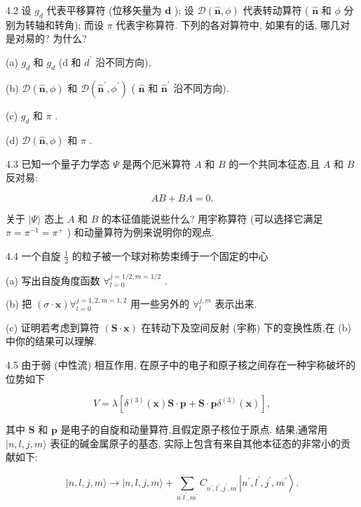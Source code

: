 4.2 设 ${g}_{d}$ 代表平移算符 (位移矢量为 $\mathbf{d}$ ); 设 $\mathcal{D}\left( {\widehat{\mathbf{n}},\phi }\right)$ 代表转动算符 ( $\widehat{\mathbf{n}}$ 和 $\phi$ 分别为转轴和转角); 而设 $\pi$ 代表宇称算符. 下列的各对算符中, 如果有的话, 哪几对是对易的? 为什么?

(a) ${g}_{d}$ 和 ${g}_{d}$ (d 和 ${d}^{\prime }$ 沿不同方向),

(b) $\mathcal{D}\left( {\widehat{\mathbf{n}},\phi }\right)$ 和 $\mathcal{D}\left( {{\widehat{\mathbf{n}}}^{\prime },{\phi }^{\prime }}\right)$ ( $\widehat{\mathbf{n}}$ 和 ${\widehat{\mathbf{n}}}^{\prime }$ 沿不同方向).

(c) ${g}_{d}$ 和 $\pi$ .

(d) $\mathcal{D}\left( {\widehat{\mathbf{n}},\phi }\right)$ 和 $\pi$ .

4.3 已知一个量子力学态 $\Psi$ 是两个厄米算符 $A$ 和 $B$ 的一个共同本征态,且 $A$ 和 $B$ 反对易:

$$
{AB} + {BA} = 0.
$$

关于 $|\Psi \rangle$ 态上 $A$ 和 $B$ 的本征值能说些什么? 用宇称算符 (可以选择它满足 $\pi = {\pi }^{-1} = {\pi }^{ + }$ ) 和动量算符为例来说明你的观点.

4.4 一个自旋 $\frac{1}{2}$ 的粒子被一个球对称势束缚于一个固定的中心

(a) 写出自旋角度函数 ${\forall }_{l = 0}^{j = 1/2, m = 1/2}$ .

(b) 把 $\left( {\sigma \cdot \mathbf{x}}\right) {\forall }_{l = 0}^{j = 1,2, m = 1,2}$ 用一些另外的 ${\forall }_{l}^{j, m}$ 表示出来.

(c) 证明若考虑到算符 $\left( {\mathbf{S} \cdot \mathbf{x}}\right)$ 在转动下及空间反射 (宇称) 下的变换性质,在 (b) 中你的结果可以理解.

4.5 由于弱 (中性流) 相互作用, 在原子中的电子和原子核之间存在一种宇称破坏的位势如下

$$
V = \lambda \left\lbrack {{\delta }^{\left( 3\right) }\left( \mathbf{x}\right) \mathbf{S} \cdot \mathbf{p} + \mathbf{S} \cdot \mathbf{p}{\delta }^{\left( 3\right) }\left( \mathbf{x}\right) }\right\rbrack ,
$$

其中 $\mathbf{S}$ 和 $\mathbf{p}$ 是电子的自旋和动量算符,且假定原子核位于原点. 结果,通常用 $|n, l, j, m\rangle$ 表征的碱金属原子的基态, 实际上包含有来自其他本征态的非常小的贡献如下:

$$
\left| {n, l, j, m\rangle \rightarrow }\right| n, l, j, m\rangle + \mathop{\sum }\limits_{{{n}^{\prime }{l}^{\prime },{m}^{\prime }}}{C}_{{n}^{\prime },{l}^{\prime },{j}^{\prime },{m}^{\prime }}\left| {{n}^{\prime },{l}^{\prime },{j}^{\prime },{m}^{\prime }}\right\rangle .
$$

